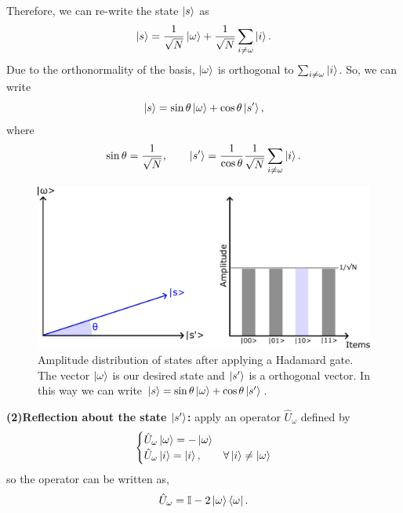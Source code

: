 Therefore, we can re-write the state $\ket{s}$ as
\begin{equation}
    \ket{s} = \frac{1}{\sqrt{N}}\ket{\omega} + \frac{1}{\sqrt{N}}\sum_{i \neq \omega} \ket{i}.
\end{equation}
Due to the orthonormality of the basis, $\ket{\omega}$ is orthogonal to $\sum_{i \neq \omega} \ket{i}$. So, we can write
\begin{equation}
    \ket{s} = \sin{\theta}\ket{\omega} + \cos{\theta}\ket{s'},
\end{equation}
where
\begin{equation}
    \sin{\theta} = \frac{1}{\sqrt{N}}, \quad\quad  \ket{s'} = \frac{1}{\cos{\theta}}\frac{1}{\sqrt{N}}\sum_{i\neq \omega}\ket{i}.
\end{equation}
\begin{figure}[H]
\centering
    \includegraphics[scale=0.55]{Figures/Grover_Step1.pdf}
    \caption{Amplitude distribution of states after applying a Hadamard gate. The vector $\ket{\omega}$ is our desired state and $\ket{s'}$ is a orthogonal vector. In this way we can write $\ket{s} = \sin{\theta}\ket{\omega} + \cos{\theta}\ket{s'}$.}
    \label{fig:Grover_step1}
\end{figure}
\textbf{(2)Reflection about the state $\ket{s'}$:} apply an operator $\hat{U}_{\omega}$ defined by
\begin{equation}
     \begin{cases}
       \hat{U}_{\omega}\ket{\omega} = -\ket{\omega} \\
       \hat{U}_{\omega}\ket{i} = \ket{i}, &  \forall \ket{i}\neq \ket{\omega} \\
     \end{cases}
\end{equation}
so the operator can be written as,
\begin{equation}
    \hat{U}_{\omega} = \mathbb{I} - 2\ket{\omega}\bra{\omega}.
\end{equation}
